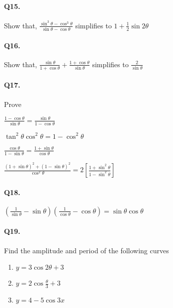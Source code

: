 \documentclass{article}
\begin{document}
\paragraph{Q15.}
Show that, $\frac{\sin^{3}\theta - \cos^{3}\theta}{\sin\theta - \cos\theta}$ simplifies to $1 + \frac{1}{2} \sin 2\theta$

\paragraph{Q16.}
Show that, $\frac{\sin\theta}{1 + \cos\theta} + \frac{1+\cos\theta}{\sin\theta}$ simplifies to $\frac{2}{\sin\theta}$

\paragraph{Q17.}
Prove 

\begin{enumerate*}[label=(\alph*)]
  \item $\frac{1 - \cos\theta}{\sin\theta} = \frac{\sin\theta}{1-\cos\theta}$
  \item $\tan^{2}\theta \cos^{2}\theta = 1 - \cos^{2}\theta$
  \item $\frac{\cos\theta}{1-\sin\theta} = \frac{1+\sin\theta}{\cos\theta}$
  \item $\frac{(1+\sin\theta)^{2}+(1-\sin\theta)^{2}}{\cos^{2}\theta} = 2 \left[ \frac{1+\sin^{2}\theta}{1-\sin^{2}\theta} \right]$
\end{enumerate*}

\paragraph{Q18.}

\begin{enumerate*}[label=(\alph*)]
  \item $\left( \frac{1}{\sin\theta} - \sin\theta \right) \left( \frac{1}{\cos\theta} - \cos\theta \right) = \sin\theta \cos\theta$
\end{enumerate*}

\paragraph{Q19.}
Find the amplitude and period of the following curves

\begin{enumerate}[label=]
  \item $y = 3\cos 2\theta + 3$
  \item $y = 2\cos \frac{\theta}{3} + 3$
  \item $y = 4 - 5\cos 3x$
\end{enumerate}
\end{document}
